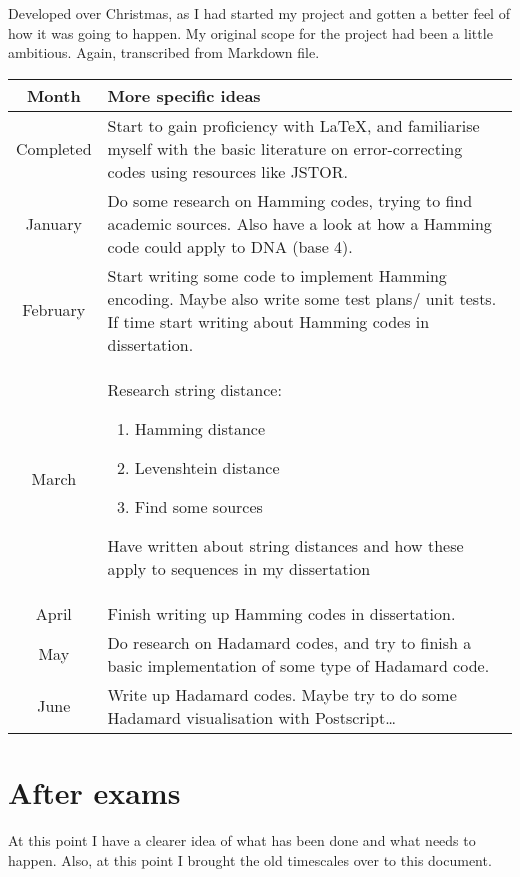 \documentclass[a4paper,11pt]{article}
\begin{document}
    Developed over Christmas, as I had started my project and gotten a better
    feel of how it was going to happen. My original scope for the project had
    been a little ambitious. Again, transcribed from Markdown file.

    \begin{center}
    {
    \renewcommand{\arraystretch}{1.3}
    \begin{longtable}{c p{}}
    \toprule
    Month & More specific ideas \\
    \midrule
    \rowcolor{green} Completed &
    Start to gain proficiency with \LaTeX, and familiarise myself with the basic
    literature on error-correcting codes using resources like JSTOR. \\
    January &
    Do some research on Hamming codes, trying to find academic sources. Also
    have a look at how a Hamming code could apply to DNA (base 4). \\
    February &
    Start writing some code to implement Hamming encoding. Maybe also write some
    test plans/ unit tests. If time start writing about Hamming codes in
    dissertation.  \\
    March &
    Research string distance:
    \begin{enumerate}
        \item Hamming distance
        \item Levenshtein distance
        \item Find some sources
    \end{enumerate}
    Have written about string distances and how these apply to sequences in my
    dissertation \\
    April &
    Finish writing up Hamming codes in dissertation. \\
    May &
    Do research on Hadamard codes, and try to finish a basic implementation of
    some type of Hadamard code. \\
    June &
    Write up Hadamard codes. Maybe try to do some Hadamard visualisation with
    Postscript\ldots \\
    \bottomrule
    \end{longtable}
    }
    \end{center}

    \section{After exams}

    At this point I have a clearer idea of what has been done and what needs to
    happen. Also, at this point I brought the old timescales over to this
    document.
\end{document}
